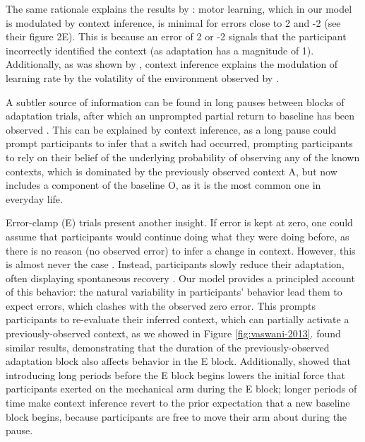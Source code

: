 \documentclass[a4paper,doc,floatsintext,natbib]{apa6}%
\def \fref #1{Figure \ref{#1}}     %
\begin{document}
The same rationale explains the results by \cite{Herzfeld_memory_2014}: motor learning, which in our model is modulated by context inference, is minimal for errors close to 2 and -2 (see their figure 2E). This is because an error of 2 or -2 signals that the participant incorrectly identified the context (as adaptation has a magnitude of 1). Additionally, as was shown by \cite{Heald_Contextual_2021}, context inference explains the modulation of learning rate by the volatility of the environment observed by \cite{Herzfeld_memory_2014}.

A subtler source of information can be found in long pauses between blocks of adaptation trials, after which an unprompted partial return to baseline has been observed \cite{Ethier_Spontaneous_2008}. This can be explained by context inference, as a long pause could prompt participants to infer that a switch had occurred, prompting participants to rely on their belief of the underlying probability of observing any of the known contexts, which is dominated by the previously observed context A, but now includes a component of the baseline O, as it is the most common one in everyday life.

Error-clamp (E) trials present another insight. If error is kept at zero, one could assume that participants would continue doing what they were doing before, as there is no reason (no observed error) to infer a change in context. However, this is almost never the case \cite[e.g.][]{Smith_Interacting_2006,Ethier_Spontaneous_2008,Forano_Timescales_2020,Vaswani_Decay_2013,Scheidt_Persistence_2000,Pekny_Protection_2011}. Instead, participants slowly reduce their adaptation, often displaying spontaneous recovery \cite[e.g.][]{Smith_Interacting_2006}. Our model provides a principled account of this behavior: the natural variability in participants' behavior lead them to expect errors, which clashes with the observed zero error. This prompts participants to re-evaluate their inferred context, which can partially activate a previously-observed context, as we showed in \fref{fig:vaswani-2013}. \cite{Pekny_Protection_2011} found similar results, demonstrating that the duration of the previously-observed adaptation block also affects behavior in the E block. Additionally, \cite{Criscimagna-Hemminger_Consolidation_2008} showed that introducing long periods before the E block begins lowers the initial force that participants exerted on the mechanical arm during the E block; longer periods of time make context inference revert to the prior expectation that a new baseline block begins, because participants are free to move their arm about during the pause.
\end{document}
